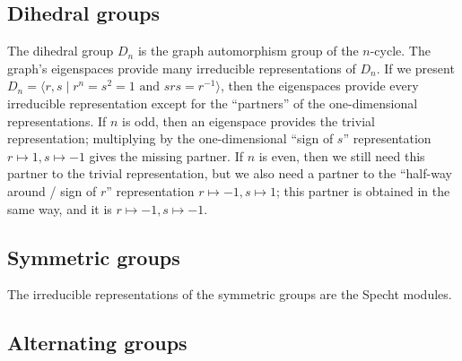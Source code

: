 \subsection{Dihedral groups} %
\pan The dihedral group $D_n$ is the graph automorphism group of the $n$-cycle. The graph's eigenspaces provide many irreducible representations of $D_n$. If we present $D_n = \langle r, s \;\vert\; r^n = s^2 = 1 \text{ and } s r s = r^{-1} \rangle$, then the eigenspaces provide every irreducible representation except for the ``partners'' of the one-dimensional representations. If $n$ is odd, then an eigenspace provides the trivial representation; multiplying by the one-dimensional ``sign of $s$'' representation $r \mapsto 1, s \mapsto -1$ gives the missing partner. If $n$ is even, then we still need this partner to the trivial representation, but we also need a partner to the ``half-way around / sign of $r$'' representation $r \mapsto -1, s \mapsto 1$; this partner is obtained in the same way, and it is $r \mapsto -1, s \mapsto -1$. 

\subsection{Symmetric groups} %
\pan The irreducible representations of the symmetric groups are the Specht modules. 

\subsection{Alternating groups} %
\pan {}
